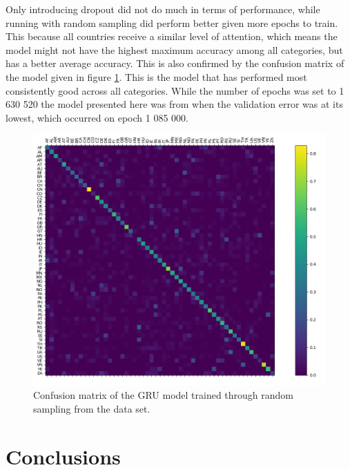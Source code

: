 \documentclass[runningheads]{llncs}
\begin{document}
Only introducing dropout did not do much in terms of performance, while running with random sampling did perform better given more epochs to train. This because all countries receive a similar level of attention, which means the model might not have the highest maximum accuracy among all categories, but has a better average accuracy. This is also confirmed by the confusion matrix of the model given in figure \ref{fig:gru10}. This is the model that has performed most consistently good across all categories. While the number of epochs was set to 1 630 520 the model presented here was from when the validation error was at its lowest, which occurred on epoch 1 085 000.

\begin{figure}[!ht]
	\centering
	\includegraphics[width=.5\linewidth]{plots/conf_matrix_GRU_model_10.png}
	\caption{ Confusion matrix of the GRU model trained through random sampling from the data set.}
	\label{fig:gru10}
\end{figure}




\section{Conclusions}

\end{document}

